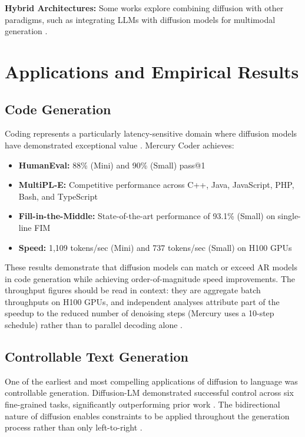\documentclass[11pt]{article}
\begin{document}
\textbf{Hybrid Architectures:} Some works explore combining diffusion with other paradigms, such as integrating LLMs with diffusion models for multimodal generation \cite{benjdira2025integrating}.

\section{Applications and Empirical Results}

\subsection{Code Generation}

Coding represents a particularly latency-sensitive domain where diffusion models have demonstrated exceptional value \cite{khanna2025mercury}. Mercury Coder achieves:

\begin{itemize}
    \item \textbf{HumanEval:} 88\% (Mini) and 90\% (Small) pass@1 \cite{khanna2025mercury}
    \item \textbf{MultiPL-E:} Competitive performance across C++, Java, JavaScript, PHP, Bash, and TypeScript \cite{khanna2025mercury}
    \item \textbf{Fill-in-the-Middle:} State-of-the-art performance of 93.1\% (Small) on single-line FIM \cite{khanna2025mercury}
    \item \textbf{Speed:} 1,109 tokens/sec (Mini) and 737 tokens/sec (Small) on H100 GPUs \cite{khanna2025mercury}
\end{itemize}

These results demonstrate that diffusion models can match or exceed AR models in code generation while achieving order-of-magnitude speed improvements. The throughput figures should be read in context: they are aggregate batch throughputs on H100 GPUs, and independent analyses attribute part of the speedup to the reduced number of denoising steps (Mercury uses a 10-step schedule) rather than to parallel decoding alone \cite{wang2025d2f, fu2025efficientdlm}.

\subsection{Controllable Text Generation}

One of the earliest and most compelling applications of diffusion to language was controllable generation. Diffusion-LM demonstrated successful control across six fine-grained tasks, significantly outperforming prior work \cite{li2022diffusion}. The bidirectional nature of diffusion enables constraints to be applied throughout the generation process rather than only left-to-right \cite{li2025surveydlm}.
\end{document}
